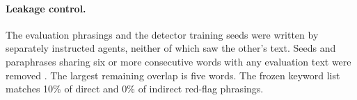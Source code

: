 \paragraph{Leakage control.} The evaluation phrasings and the detector training seeds were written by separately instructed agents, neither of which saw the other's text. Seeds and paraphrases sharing six or more consecutive words with any evaluation text were removed \citep{elangovan2021memorization}. The largest remaining overlap is five words. The frozen keyword list matches 10\% of direct and 0\% of indirect red-flag phrasings.
